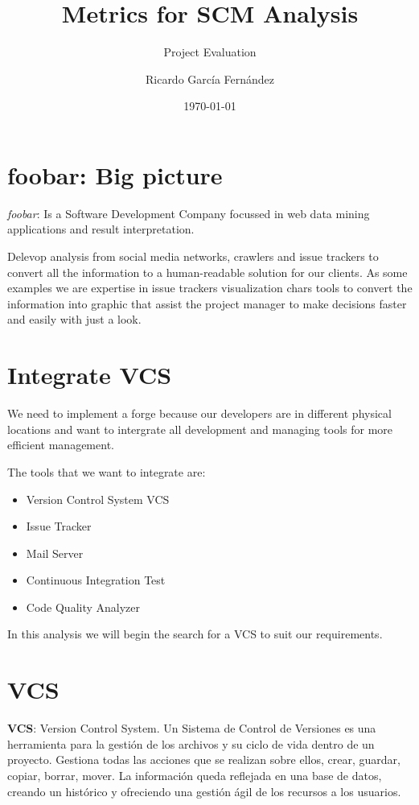 \documentclass[11pt]{scrartcl}
\title{\textbf{Metrics for SCM Analysis}}
\subtitle{Project Evaluation}
\author{Ricardo García Fernández}
\date{\today}
\begin{document}
\maketitle

\tableofcontents

\newpage

\section{foobar: Big picture}

\emph{foobar}: Is a Software Development Company focussed in web data mining applications and result interpretation.

\par Delevop analysis from social media networks, crawlers and issue trackers to convert all the information to a human-readable solution for our clients. As some examples we are expertise in issue trackers visualization chars tools to convert the information into graphic that assist the project manager to make decisions faster and easily with just a look.

\section{Integrate VCS}

We need to implement a forge because our developers are in different physical locations and want to intergrate all development and managing tools for more efficient management.

The tools that we want to integrate are:

\begin{itemize}
    \item Version Control System VCS
    \item Issue Tracker
    \item Mail Server
    \item Continuous Integration Test
    \item Code Quality Analyzer
\end{itemize}

In this analysis we will begin the search for a VCS to suit our requirements.

\section{VCS}

\par \textbf{VCS}: Version Control System. Un Sistema de Control de Versiones es una herramienta para la gestión de los archivos y su ciclo de vida dentro de un proyecto. Gestiona todas las acciones que se realizan sobre ellos, crear, guardar, copiar, borrar, mover. La información queda reflejada en una base de datos, creando un histórico y ofreciendo una gestión ágil de los recursos a los usuarios.
\end{document}

